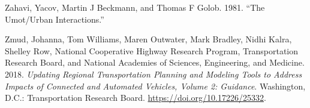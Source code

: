 \documentclass[12pt,]{article}
\begin{document}
\leavevmode\hypertarget{ref-zahavi1981umot}{}%
Zahavi, Yacov, Martin J Beckmann, and Thomas F Golob. 1981. ``The
Umot/Urban Interactions.''

\leavevmode\hypertarget{ref-zmud2018updating}{}%
Zmud, Johanna, Tom Williams, Maren Outwater, Mark Bradley, Nidhi Kalra,
Shelley Row, National Cooperative Highway Research Program,
Transportation Research Board, and National Academies of Sciences,
Engineering, and Medicine. 2018. \emph{Updating Regional Transportation
Planning and Modeling Tools to Address Impacts of Connected and
Automated Vehicles, Volume 2: Guidance}. Washington, D.C.:
Transportation Research Board. \url{https://doi.org/10.17226/25332}.
\end{document}
